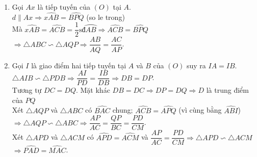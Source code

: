 \begin{bt}
{\begin{enumerate}
$\Rightarrow OD$ là trung trực của $BC$ $\Leftrightarrow OD \perp BM$.\\
$\triangle OBD$ vuông tại $B$, đường cao $BM$\\
$\Rightarrow OB^2=  OM.OD \Rightarrow OM = \dfrac{9}{5}\Rightarrow MD = \dfrac{16}{5}$.\\
$BM^2 = OM.MD = \dfrac{144}{25}\Rightarrow BM = \dfrac{12}{5}\Rightarrow BC = 2BM = \dfrac{24}{5}$.\\
$S_{\triangle BCD} = \dfrac{1}{2}BC.MD = \dfrac{192}{25}\mbox{cm}^2$.
\item Gọi $Ax$ là tiếp tuyến của $(O)$ tại $A$.\\
$d\parallel Ax \Rightarrow \widehat{xAB} =\widehat{BPQ} $ (so le trong)\\
Mà $\widehat{xAB} = \widehat{ACB} = \dfrac{1}{2}\mbox{sđ}\wideparen{AB}\Rightarrow \widehat{ACB} =\widehat{BPQ}$\\
$\Rightarrow \triangle ABC \backsim \triangle AQP \Rightarrow \dfrac{AB}{AQ}=\dfrac{AC}{AP}$.
\item Gọi $I$ là giao điểm hai tiếp tuyến tại $A$ và $B$ của $(O)$ suy ra $IA = IB$.\\
$\triangle AIB\backsim \triangle PDB \Rightarrow \dfrac{AI}{PD}=\dfrac{IB}{DB}\Rightarrow DB = DP$.\\
Tương tự $DC = DQ$. Mặt khác $DB = DC\Rightarrow DP = DQ\Rightarrow D$ là trung điểm của $PQ$\\
Xét $\triangle AQP$ và $\triangle ABC$ có $\widehat{BAC}$ chung; $\widehat{ACB}=\widehat{APQ}$ (vì cùng bằng $\widehat{ABI}$)\\
$\Rightarrow \triangle AQP\backsim \triangle ABC \Rightarrow \dfrac{AP}{AC}=\dfrac{QP}{BC}=\dfrac{PD}{CM}$.\\
Xét $\triangle APD$ và $\triangle ACM$ có $\widehat{APD} = \widehat{ACM}$ và $\dfrac{AP}{AC}=\dfrac{PD}{CM}\Rightarrow \triangle APD\backsim \triangle ACM$\\
$\Rightarrow \widehat{PAD} = \widehat{MAC}$.
\end{enumerate}
	}
\end{bt}
